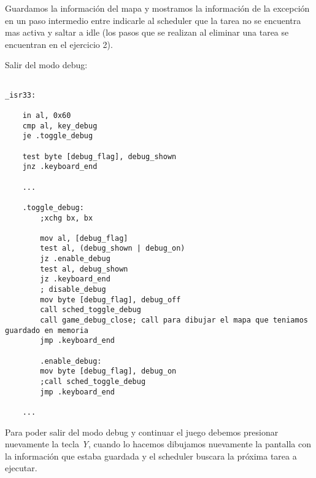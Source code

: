 	Guardamos la información del mapa y mostramos la información de la excepción en un paso intermedio entre indicarle al scheduler que la tarea no se encuentra mas activa y saltar a idle (los pasos que se realizan al eliminar una tarea se encuentran en el ejercicio 2).

	Salir del modo debug:

	\begin{lstlisting}

_isr33:

    in al, 0x60
    cmp al, key_debug
    je .toggle_debug

    test byte [debug_flag], debug_shown
    jnz .keyboard_end

    ...

    .toggle_debug:
        ;xchg bx, bx

        mov al, [debug_flag]
        test al, (debug_shown | debug_on)
        jz .enable_debug
        test al, debug_shown
        jz .keyboard_end
        ; disable_debug
        mov byte [debug_flag], debug_off
        call sched_toggle_debug
        call game_debug_close; call para dibujar el mapa que teniamos guardado en memoria
        jmp .keyboard_end

        .enable_debug:
        mov byte [debug_flag], debug_on
        ;call sched_toggle_debug
        jmp .keyboard_end

    ...
	\end{lstlisting}

	Para poder salir del modo debug y continuar el juego debemos presionar nuevamente la tecla \textit{Y}, cuando lo hacemos dibujamos nuevamente la pantalla con la información que estaba guardada y el scheduler buscara la próxima tarea a ejecutar.